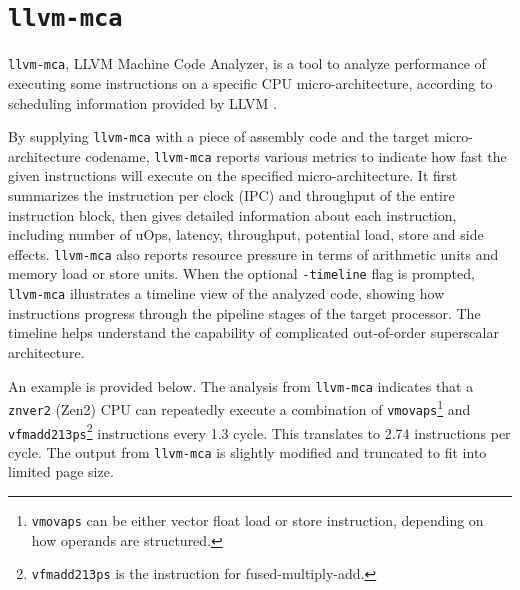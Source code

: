 \documentclass[logo,bsc,singlespacing,parskip]{infthesis}
\newcommand{\mca}{\texttt{llvm-mca}}
\begin{document}
\section{\mca{}}

\mca{}, LLVM Machine Code Analyzer, is a tool to analyze performance of executing
some instructions on a specific CPU micro-architecture, according to scheduling
information provided by LLVM \cite{llvm-mca}. 

By supplying \mca{} with a piece of assembly code and the target
micro-architecture codename, \mca{} reports various metrics to indicate how fast
the given instructions will execute on the specified micro-architecture. It
first summarizes the instruction per clock (IPC) and throughput of the entire
instruction block, then gives detailed information about each instruction,
including number of uOps, latency, throughput, potential load, store and side
effects. \mca{} also reports resource pressure in terms of arithmetic units and
memory load or store units. When the optional \texttt{-timeline} flag is
prompted, \mca{} illustrates a timeline view of the analyzed code, showing how
instructions progress through the pipeline stages of the target processor. The
timeline helps understand the capability of complicated out-of-order superscalar
architecture. 

An example is provided below. The analysis from \mca{} indicates that a \texttt{znver2}
(Zen2) CPU can repeatedly execute a combination of 
\texttt{vmovaps}\footnote{\texttt{vmovaps} can be either vector float load or 
store instruction, depending on how operands are structured.}
and \texttt{vfmadd213ps}\footnote{\texttt{vfmadd213ps} is the instruction for 
fused-multiply-add.}
instructions every 1.3 cycle. This translates to 2.74 instructions per cycle. 
The output from \mca{} is slightly modified and truncated to fit into 
limited page size. 
\end{document}
